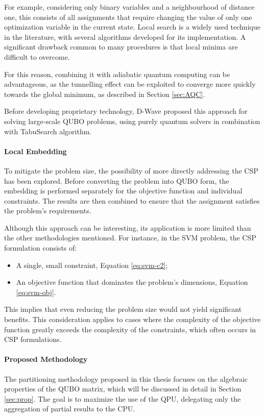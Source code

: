 For example, considering only binary variables and a neighbourhood of distance one, this consists of all assignments that require changing the value of only one optimization variable in the current state.
Local search is a widely used technique in the literature, with several algorithms developed for its implementation. 
A significant drawback common to many procedures is that local minima are difficult to overcome. 

For this reason, combining it with adiabatic quantum computing can be advantageous, as the tunnelling effect can be exploited to converge more quickly towards the global minimum, as described in Section \ref{sec:AQC}.

Before developing proprietary technology, D-Wave proposed this approach for solving large-scale QUBO problems\cite{hybridsearch}, using purely quantum solvers in combination with TabuSearch algorithm\cite{tabusearch}.

\paragraph{Local Embedding} To mitigate the problem size, the possibility of more directly addressing the CSP has been explored\cite{localembedding}. 
Before converting the problem into QUBO form, the embedding is performed separately for the objective function and individual constraints. 
The results are then combined to ensure that the assignment satisfies the problem's requirements.

Although this approach can be interesting, its application is more limited than the other methodologies mentioned.
For instance, in the SVM problem, the CSP formulation consists of: 

\begin{itemize} 
	\item A single, small constraint, Equation \ref{eq:svm-c2}; 
	\item An objective function that dominates the problem's dimensions, Equation \ref{eq:svm-obj}. 
\end{itemize}

This implies that even reducing the problem size would not yield significant benefits. 
This consideration applies to cases where the complexity of the objective function greatly exceeds the complexity of the constraints, which often occurs in CSP formulations.

\paragraph{Proposed Methodology} The partitioning methodology proposed in this thesis focuses on the algebraic properties of the QUBO matrix, which will be discussed in detail in Section \ref{sec:prop}. 
The goal is to maximize the use of the QPU, delegating only the aggregation of partial results to the CPU.


